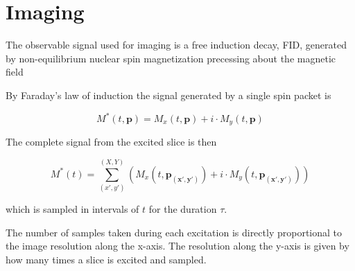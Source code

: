 \section{Imaging}
\label{sec:imaging}


The observable signal used for imaging is a free induction decay, FID,
generated by non-equilibrium nuclear spin magnetization precessing
about the magnetic field





By Faraday's law of induction the signal generated by a single spin
packet is \cite{feeman}

\begin{displaymath}
  M^*(t, \mathbf{p}) = M_x(t, \mathbf{p}) + i \cdot M_y(t, \mathbf{p})
\end{displaymath}

The complete signal from the excited slice is then

\begin{displaymath}
    M^*(t) = \sum^{(X, Y)}_{(x',y')} (M_x(t, \mathbf{p_{(x',y')}}) + i \cdot M_y(t, \mathbf{p_{(x',y')}}))
\end{displaymath}

which is sampled in intervals of $t$ for the duration $\tau$.


The number of samples taken during each excitation is directly
proportional to the image resolution along the x-axis. The resolution
along the y-axis is given by how many times a slice is excited and
sampled.


